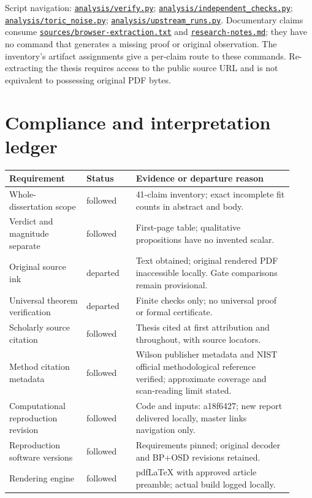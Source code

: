 \documentclass[11pt]{article}
\begin{document}
Script navigation: \href{https://github.com/alectionary/vibe-math/blob/master/formalization/quintavalle-hgp/analysis/verify.py}{\nolinkurl{analysis/verify.py}}; \href{https://github.com/alectionary/vibe-math/blob/master/formalization/quintavalle-hgp/analysis/independent_checks.py}{\nolinkurl{analysis/independent_checks.py}}; \href{https://github.com/alectionary/vibe-math/blob/master/formalization/quintavalle-hgp/analysis/toric_noise.py}{\nolinkurl{analysis/toric_noise.py}}; \href{https://github.com/alectionary/vibe-math/blob/master/formalization/quintavalle-hgp/analysis/upstream_runs.py}{\nolinkurl{analysis/upstream_runs.py}}. Documentary claims consume \href{https://github.com/alectionary/vibe-math/blob/master/formalization/quintavalle-hgp/sources/browser-extraction.txt}{\nolinkurl{sources/browser-extraction.txt}} and \href{https://github.com/alectionary/vibe-math/blob/master/formalization/quintavalle-hgp/research-notes.md}{\nolinkurl{research-notes.md}}; they have no command that generates a missing proof or original observation. The inventory's artifact assignments give a per-claim route to these commands. Re-extracting the thesis requires access to the public source URL and is not equivalent to possessing original PDF bytes.

\clearpage
\section{Compliance and interpretation ledger}
\begin{longtable}{p{0.25\linewidth}p{0.16\linewidth}p{0.51\linewidth}}
\toprule Requirement & Status & Evidence or departure reason\\\midrule
Whole-dissertation scope & followed & 41-claim inventory; exact incomplete fit counts in abstract and body.\\
Verdict and magnitude separate & followed & First-page table; qualitative propositions have no invented scalar.\\
Original source ink & departed & Text obtained; original rendered PDF inaccessible locally. Gate comparisons remain provisional.\\
Universal theorem verification & departed & Finite checks only; no universal proof or formal certificate.\\
Scholarly source citation & followed & Thesis cited at first attribution and throughout, with source locators.\\
Method citation metadata & followed & Wilson publisher metadata and NIST official methodological reference verified; approximate coverage and scan-reading limit stated.\\
Computational reproduction revision & followed & Code and inputs: a18f6427; new report delivered locally, master links navigation only.\\
Reproduction software versions & followed & Requirements pinned; original decoder and BP+OSD revisions retained.\\
Rendering engine & followed & pdfLaTeX with approved article preamble; actual build logged locally.\\
\bottomrule\end{longtable}

\end{document}
